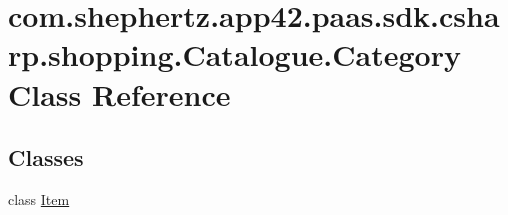 \hypertarget{classcom_1_1shephertz_1_1app42_1_1paas_1_1sdk_1_1csharp_1_1shopping_1_1_catalogue_1_1_category}{\section{com.\+shephertz.\+app42.\+paas.\+sdk.\+csharp.\+shopping.\+Catalogue.\+Category Class Reference}
\label{classcom_1_1shephertz_1_1app42_1_1paas_1_1sdk_1_1csharp_1_1shopping_1_1_catalogue_1_1_category}
}
\subsection*{Classes}
\begin{DoxyCompactItemize}
\item 
class \hyperlink{classcom_1_1shephertz_1_1app42_1_1paas_1_1sdk_1_1csharp_1_1shopping_1_1_catalogue_1_1_category_1_1_item}{Item}
\end{DoxyCompactItemize}
